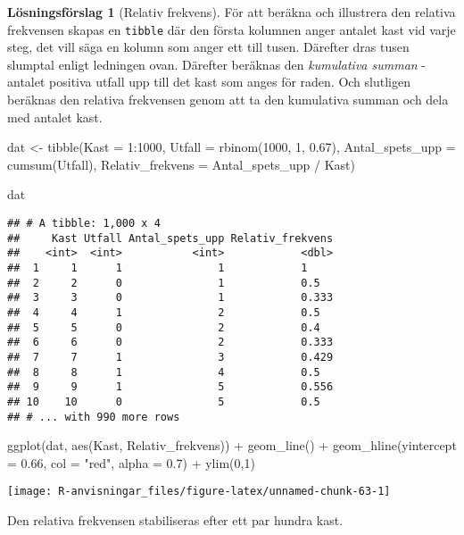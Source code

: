\documentclass[
]{book}
\newenvironment{Shaded}{\begin{snugshade}}{\end{snugshade}}
\newcommand{\AttributeTok}[1]{\textcolor[rgb]{0.77,0.63,0.00}{#1}}
\newcommand{\DecValTok}[1]{\textcolor[rgb]{0.00,0.00,0.81}{#1}}
\newcommand{\FloatTok}[1]{\textcolor[rgb]{0.00,0.00,0.81}{#1}}
\newcommand{\FunctionTok}[1]{\textcolor[rgb]{0.00,0.00,0.00}{#1}}
\newcommand{\NormalTok}[1]{#1}
\newcommand{\OtherTok}[1]{\textcolor[rgb]{0.56,0.35,0.01}{#1}}
\newcommand{\SpecialCharTok}[1]{\textcolor[rgb]{0.00,0.00,0.00}{#1}}
\newcommand{\StringTok}[1]{\textcolor[rgb]{0.31,0.60,0.02}{#1}}
\theoremstyle{definition}
\theoremstyle{definition}
\theoremstyle{definition}
\theoremstyle{definition}
\newtheorem{hypothesis}{Lösningsförslag}[chapter]
\theoremstyle{remark}
\begin{document}
\begin{hypothesis}[Relativ frekvens]
För att beräkna och illustrera den relativa frekvensen skapas en \texttt{tibble} där den första kolumnen anger antalet kast vid varje steg, det vill säga en kolumn som anger ett till tusen. Därefter dras tusen slumptal enligt ledningen ovan. Därefter beräknas den \emph{kumulativa summan} - antalet positiva utfall upp till det kast som anges för raden. Och slutligen beräknas den relativa frekvensen genom att ta den kumulativa summan och dela med antalet kast.

\begin{Shaded}
\begin{Highlighting}[]
\NormalTok{dat }\OtherTok{\textless{}{-}} \FunctionTok{tibble}\NormalTok{(}\AttributeTok{Kast =} \DecValTok{1}\SpecialCharTok{:}\DecValTok{1000}\NormalTok{,}
              \AttributeTok{Utfall =} \FunctionTok{rbinom}\NormalTok{(}\DecValTok{1000}\NormalTok{, }\DecValTok{1}\NormalTok{, }\FloatTok{0.67}\NormalTok{),}
              \AttributeTok{Antal\_spets\_upp =} \FunctionTok{cumsum}\NormalTok{(Utfall),}
              \AttributeTok{Relativ\_frekvens =}\NormalTok{ Antal\_spets\_upp }\SpecialCharTok{/}\NormalTok{ Kast)}

\NormalTok{dat}
\end{Highlighting}
\end{Shaded}

\begin{verbatim}
## # A tibble: 1,000 x 4
##     Kast Utfall Antal_spets_upp Relativ_frekvens
##    <int>  <int>           <int>            <dbl>
##  1     1      1               1            1    
##  2     2      0               1            0.5  
##  3     3      0               1            0.333
##  4     4      1               2            0.5  
##  5     5      0               2            0.4  
##  6     6      0               2            0.333
##  7     7      1               3            0.429
##  8     8      1               4            0.5  
##  9     9      1               5            0.556
## 10    10      0               5            0.5  
## # ... with 990 more rows
\end{verbatim}

\begin{Shaded}
\begin{Highlighting}[]
\FunctionTok{ggplot}\NormalTok{(dat, }\FunctionTok{aes}\NormalTok{(Kast, Relativ\_frekvens)) }\SpecialCharTok{+}
  \FunctionTok{geom\_line}\NormalTok{() }\SpecialCharTok{+}
  \FunctionTok{geom\_hline}\NormalTok{(}\AttributeTok{yintercept =} \FloatTok{0.66}\NormalTok{, }\AttributeTok{col =} \StringTok{"red"}\NormalTok{, }\AttributeTok{alpha =} \FloatTok{0.7}\NormalTok{) }\SpecialCharTok{+}
  \FunctionTok{ylim}\NormalTok{(}\DecValTok{0}\NormalTok{,}\DecValTok{1}\NormalTok{)}
\end{Highlighting}
\end{Shaded}

\begin{center}\texttt{[image: R-anvisningar\_files/figure-latex/unnamed-chunk-63-1]} \end{center}

Den relativa frekvensen stabiliseras efter ett par hundra kast.
\end{hypothesis}
\end{document}
